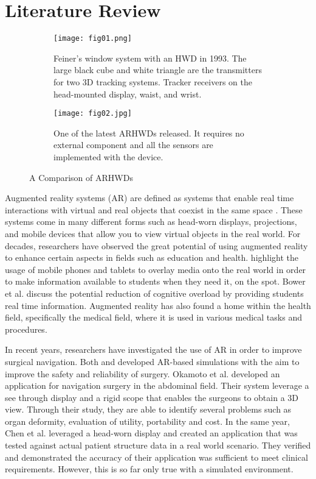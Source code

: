 \section{Literature Review}
\label{sec:literaturereview}

\begin{figure}[h!]
  \centering
  \begin{subfigure}[b]{0.6\textwidth}
    \texttt{[image: fig01.png]}
    \caption{Feiner's window system with an HWD in 1993. The large black cube and white triangle are the transmitters for two 3D tracking systems. Tracker receivers on the head-mounted display, waist, and wrist.}
  \end{subfigure}
  \begin{subfigure}[b]{0.6\textwidth}
    \texttt{[image: fig02.jpg]}
    \caption{One of the latest ARHWDs released. It requires no external component and all the sensors are implemented with the device.}
  \end{subfigure}
  \caption{A Comparison of ARHWDs}
  \label{fig:compareARHWD}
\end{figure}
Augmented reality systems (AR) are defined as systems that enable real time interactions with virtual and real objects that coexist in the same space \cite{Azuma1997}. These systems come in many different forms such as head-worn displays, projections, and mobile devices that allow you to view virtual objects in the real world. For decades, researchers have observed the great potential of using augmented reality to enhance certain aspects in fields such as education and health. \cite{Bower2014} highlight the usage of mobile phones and tablets to overlay media onto the real world in order to make information available to students when they need it, on the spot. Bower et al. discuss the potential reduction of cognitive overload by providing students real time information. Augmented reality has also found a home within the health field, specifically the medical field, where it is used in various medical tasks and procedures.

In recent years, researchers have investigated the use of AR in order to improve surgical navigation. Both \cite{Okamoto2015} and \cite{Chen2015} developed AR-based simulations with the aim to improve the safety and reliability of surgery. Okamoto et al. developed an application for navigation surgery in the abdominal field. Their system leverage a see through display and a rigid scope that enables the surgeons to obtain a 3D view. Through their study, they are able to identify several problems such as organ deformity, evaluation of utility, portability and cost. In the same year, Chen et al. leveraged a head-worn display and created an application that was tested against actual patient structure data in a real world scenario. They verified and demonstrated the accuracy of their application was sufficient to meet clinical requirements. However, this is so far only true with a simulated environment. 

